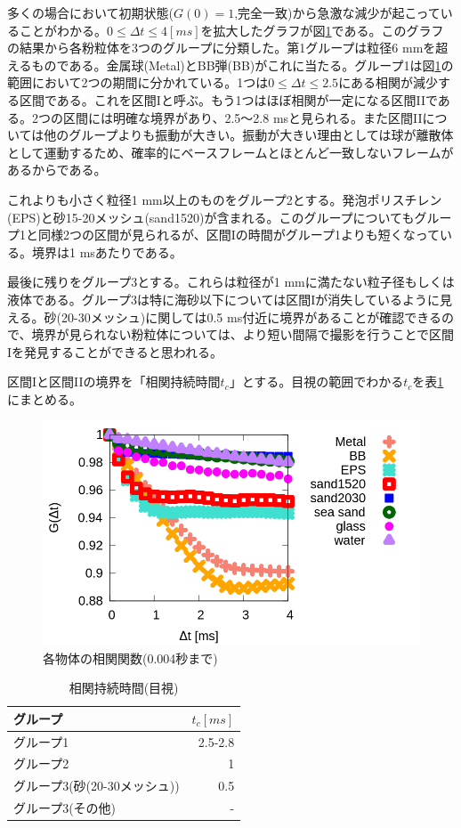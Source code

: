 \documentclass[a4paper,10pt,twocolumn,dvipdfmx]{jsarticle}
\newcommand{\Dt}{\Delta t}
\newcommand{\II}{I\hspace{-.1em}I}
\begin{document}
多くの場合において初期状態($G(0)=1$,完全一致)から急激な減少が起こっていることがわかる。$0 \leq \Delta t \leq 4 [ms]$を拡大したグラフが図\ref{fig:init}である。このグラフの結果から各粉粒体を3つのグループに分類した。第1グループは粒径6 mmを超えるものである。金属球(Metal)とBB弾(BB)がこれに当たる。グループ1は図\ref{fig:init}の範囲において2つの期間に分かれている。1つは$0 \leq \Dt \leq 2.5$にある相関が減少する区間である。これを区間Iと呼ぶ。もう1つはほぼ相関が一定になる区間\II である。2つの区間には明確な境界があり、2.5〜2.8 msと見られる。また区間\II については他のグループよりも振動が大きい。振動が大きい理由としては球が離散体として運動するため、確率的にベースフレームとほとんど一致しないフレームがあるからである。 \par
これよりも小さく粒径1 mm以上のものをグループ2とする。発泡ポリスチレン(EPS)と砂15-20メッシュ(sand1520)が含まれる。このグループについてもグループ1と同様2つの区間が見られるが、区間Iの時間がグループ1よりも短くなっている。境界は1 msあたりである。 \par
最後に残りをグループ3とする。これらは粒径が1 mmに満たない粒子径もしくは液体である。グループ3は特に海砂以下については区間Iが消失しているように見える。砂(20-30メッシュ)に関しては0.5 ms付近に境界があることが確認できるので、境界が見られない粉粒体については、より短い間隔で撮影を行うことで区間Iを発見することができると思われる。\par
区間Iと区間\II の境界を「相関持続時間$t_c$」とする。目視の範囲でわかる$t_c$を表\ref{tb:tc_eye}にまとめる。
\begin{figure}[H]
	\includegraphics[scale=0.4]{init.png}
	\caption{各物体の相関関数(0.004秒まで)}
	\label{fig:init}
\end{figure}

\begin{table}[H]
	\caption{相関持続時間(目視) \label{tb:tc_eye}}
	\begin{tabular}{lr}
		\toprule
		グループ & $t_c [ms]$ \\
		\midrule
		グループ1 & 2.5-2.8 \\
		グループ2 & 1 \\
		グループ3(砂(20-30メッシュ)) & 0.5 \\
		グループ3(その他) & - \\
		\bottomrule
	\end{tabular}
\end{table}
\end{document}
